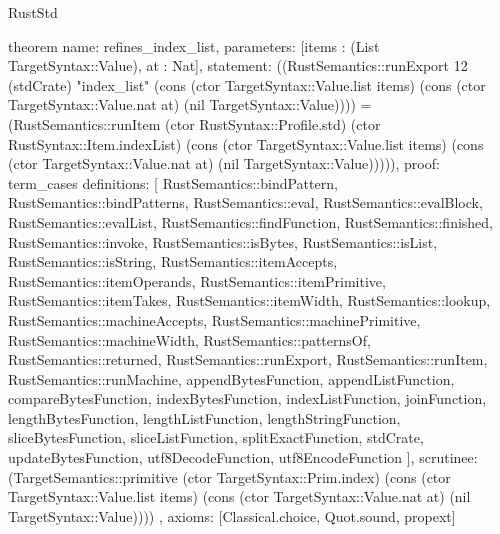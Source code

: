 \begin{lexlean}{RustStd}
\begin{semanticmodule}
theorem{
  name: refines_index_list,
  parameters: [items : (List TargetSyntax::Value), at : Nat],
  statement: ((RustSemantics::runExport 12 (stdCrate) "index_list" (cons (ctor TargetSyntax::Value.list items) (cons (ctor TargetSyntax::Value.nat at) (nil TargetSyntax::Value)))) = (RustSemantics::runItem (ctor RustSyntax::Profile.std) (ctor RustSyntax::Item.indexList) (cons (ctor TargetSyntax::Value.list items) (cons (ctor TargetSyntax::Value.nat at) (nil TargetSyntax::Value))))),
  proof: term_cases{
    definitions: [
      RustSemantics::bindPattern,
      RustSemantics::bindPatterns,
      RustSemantics::eval,
      RustSemantics::evalBlock,
      RustSemantics::evalList,
      RustSemantics::findFunction,
      RustSemantics::finished,
      RustSemantics::invoke,
      RustSemantics::isBytes,
      RustSemantics::isList,
      RustSemantics::isString,
      RustSemantics::itemAccepts,
      RustSemantics::itemOperands,
      RustSemantics::itemPrimitive,
      RustSemantics::itemTakes,
      RustSemantics::itemWidth,
      RustSemantics::lookup,
      RustSemantics::machineAccepts,
      RustSemantics::machinePrimitive,
      RustSemantics::machineWidth,
      RustSemantics::patternsOf,
      RustSemantics::returned,
      RustSemantics::runExport,
      RustSemantics::runItem,
      RustSemantics::runMachine,
      appendBytesFunction,
      appendListFunction,
      compareBytesFunction,
      indexBytesFunction,
      indexListFunction,
      joinFunction,
      lengthBytesFunction,
      lengthListFunction,
      lengthStringFunction,
      sliceBytesFunction,
      sliceListFunction,
      splitExactFunction,
      stdCrate,
      updateBytesFunction,
      utf8DecodeFunction,
      utf8EncodeFunction
    ],
    scrutinee: (TargetSemantics::primitive (ctor TargetSyntax::Prim.index) (cons (ctor TargetSyntax::Value.list items) (cons (ctor TargetSyntax::Value.nat at) (nil TargetSyntax::Value))))
  },
  axioms: [Classical.choice, Quot.sound, propext]
}


\end{semanticmodule}
\end{lexlean}
